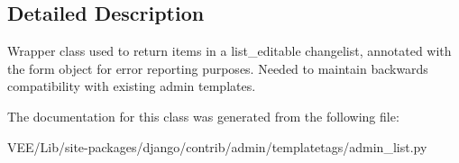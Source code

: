 \subsection{Detailed Description}
\begin{DoxyVerb}Wrapper class used to return items in a list_editable changelist, annotated
with the form object for error reporting purposes. Needed to maintain
backwards compatibility with existing admin templates.
\end{DoxyVerb}
 

The documentation for this class was generated from the following file\+:\begin{DoxyCompactItemize}
\item 
V\+E\+E/\+Lib/site-\/packages/django/contrib/admin/templatetags/admin\+\_\+list.\+py\end{DoxyCompactItemize}
